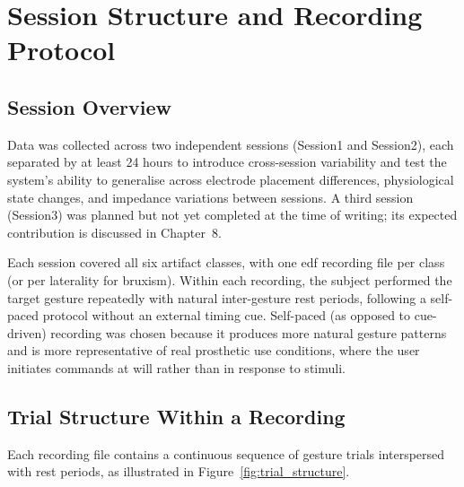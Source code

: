 \section{Session Structure and Recording Protocol}
\label{sec:dc_protocol}

\subsection{Session Overview}

Data was collected across two independent sessions (Session1 and
Session2), each separated by at least 24 hours to introduce
cross-session variability and test the system's ability to
generalise across electrode placement differences, physiological
state changes, and impedance variations between sessions. A third
session (Session3) was planned but not yet completed at the time
of writing; its expected contribution is discussed in Chapter~8.

Each session covered all six artifact classes, with one
\acrshort{edf} recording file per class (or per laterality for
bruxism). Within each recording, the subject performed the target
gesture repeatedly with natural inter-gesture rest periods,
following a self-paced protocol without an external timing cue.
Self-paced (as opposed to cue-driven) recording was chosen
because it produces more natural gesture patterns and is more
representative of real prosthetic use conditions, where the user
initiates commands at will rather than in response to stimuli.

\subsection{Trial Structure Within a Recording}

Each recording file contains a continuous sequence of gesture
trials interspersed with rest periods, as illustrated in
Figure~\ref{fig:trial_structure}.

